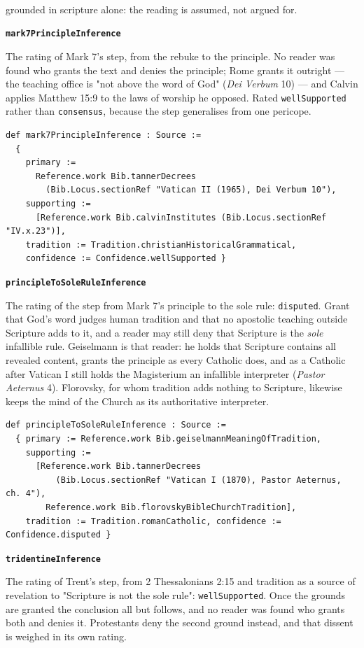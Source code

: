 \documentclass[11pt]{article}
\begin{document}
\noindent\footnotesize \textsuperscript{\dag} grounded in scripture alone: the reading is assumed, not argued for.
\normalsize

\par\medskip\noindent\textbf{\texttt{mark7\allowbreak{}Principle\allowbreak{}Inference}}\par\nobreak\noindent
The rating of Mark 7's step, from the rebuke to the principle. No reader was found who grants the text and denies the principle; Rome grants it outright — the teaching office is "not above the word of God" (\emph{Dei Verbum} 10) — and Calvin applies Matthew 15:9 to the laws of worship he opposed. Rated \texttt{well\allowbreak{}Supported} rather than \texttt{consensus}, because the step generalises from one pericope.

{\small\begin{verbatim}
def mark7PrincipleInference : Source :=
  {
    primary :=
      Reference.work Bib.tannerDecrees
        (Bib.Locus.sectionRef "Vatican II (1965), Dei Verbum 10"),
    supporting :=
      [Reference.work Bib.calvinInstitutes (Bib.Locus.sectionRef "IV.x.23")],
    tradition := Tradition.christianHistoricalGrammatical,
    confidence := Confidence.wellSupported }
\end{verbatim}}
\par\medskip\noindent\textbf{\texttt{principle\allowbreak{}To\allowbreak{}Sole\allowbreak{}Rule\allowbreak{}Inference}}\par\nobreak\noindent
The rating of the step from Mark 7's principle to the sole rule: \texttt{disputed}. Grant that God's word judges human tradition and that no apostolic teaching outside Scripture adds to it, and a reader may still deny that Scripture is the \emph{sole} infallible rule. Geiselmann is that reader: he holds that Scripture contains all revealed content, grants the principle as every Catholic does, and as a Catholic after Vatican I still holds the Magisterium an infallible interpreter (\emph{Pastor Aeternus} 4). Florovsky, for whom tradition adds nothing to Scripture, likewise keeps the mind of the Church as its authoritative interpreter.

{\small\begin{verbatim}
def principleToSoleRuleInference : Source :=
  { primary := Reference.work Bib.geiselmannMeaningOfTradition,
    supporting :=
      [Reference.work Bib.tannerDecrees
          (Bib.Locus.sectionRef "Vatican I (1870), Pastor Aeternus, ch. 4"),
        Reference.work Bib.florovskyBibleChurchTradition],
    tradition := Tradition.romanCatholic, confidence := Confidence.disputed }
\end{verbatim}}
\par\medskip\noindent\textbf{\texttt{tridentine\allowbreak{}Inference}}\par\nobreak\noindent
The rating of Trent's step, from 2 Thessalonians 2:15 and tradition as a source of revelation to "Scripture is not the sole rule": \texttt{well\allowbreak{}Supported}. Once the grounds are granted the conclusion all but follows, and no reader was found who grants both and denies it. Protestants deny the second ground instead, and that dissent is weighed in its own rating.
\end{document}
